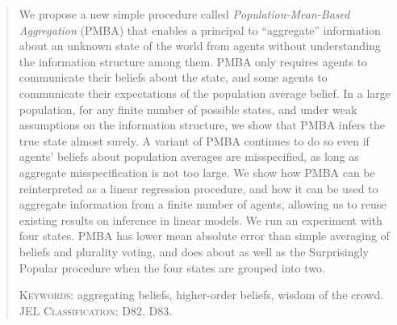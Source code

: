 \documentclass[12pt,reqno]{amsart}
\begin{document}
\begin{abstract}
We propose a new simple procedure called \emph{Population-Mean-Based Aggregation} (PMBA) that enables a principal to ``aggregate'' information about an unknown state of the world from agents without understanding the information structure among them. PMBA only requires agents to communicate their beliefs about the state, and some agents to communicate their expectations of the population average belief. In a large population, for any finite number of possible states, and under weak assumptions on the information structure,  we show that PMBA infers the true state almost surely. A variant of PMBA continues to do so even if agents' beliefs about population averages are misspecified, as long as aggregate misspecification is not too large. We show how PMBA can be reinterpreted as a linear regression procedure, and how it can be used to aggregate information from a finite number of agents, allowing us to reuse existing results on inference in linear models.  We run an experiment with four states. PMBA has lower mean absolute error than simple averaging of beliefs and plurality voting, and does about as well as the Surprisingly Popular procedure when the four states are grouped into two.

\bigskip

\textsc{Keywords:} aggregating beliefs, higher-order beliefs, wisdom of the crowd. \\
\noindent \textsc{JEL Classification:} D82, 
D83.\end{abstract}

\maketitle
\end{document}
